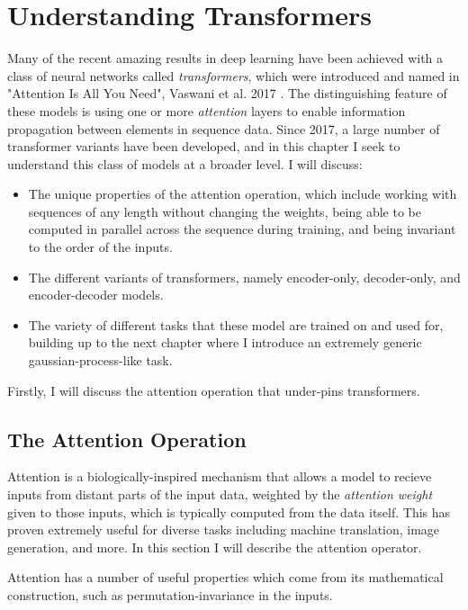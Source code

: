 \chapter{Understanding Transformers}
\label{C:transformers}

Many of the recent amazing results in deep learning have been achieved with a class of neural networks called \textit{transformers}, which were introduced and named in "Attention Is All You Need", Vaswani et al. 2017 \cite{attention-is-all-you-need}. The distinguishing feature of these models is using one or more \textit{attention} layers to enable information propagation between elements in sequence data. Since 2017, a large number of transformer variants have been developed, and in this chapter I seek to understand this class of models at a broader level. I will discuss:

\begin{itemize}
    \item The unique properties of the attention operation, which include working with sequences of any length without changing the weights, being able to be computed in parallel across the sequence during training, and being invariant to the order of the inputs.
    \item The different variants of transformers, namely encoder-only, decoder-only, and encoder-decoder models.
    \item The variety of different tasks that these model are trained on and used for, building up to the next chapter where I introduce an extremely generic gaussian-process-like task.
\end{itemize}

Firstly, I will discuss the attention operation that under-pins transformers.

\section{The Attention Operation}

Attention is a biologically-inspired mechanism that allows a model to recieve inputs from distant parts of the input data, weighted by the \textit{attention weight} given to those inputs, which is typically computed from the data itself. This has proven extremely useful for diverse tasks including machine translation, image generation, and more. In this section I will describe the attention operator.

Attention has a number of useful properties which come from its mathematical construction, such as permutation-invariance in the inputs.

